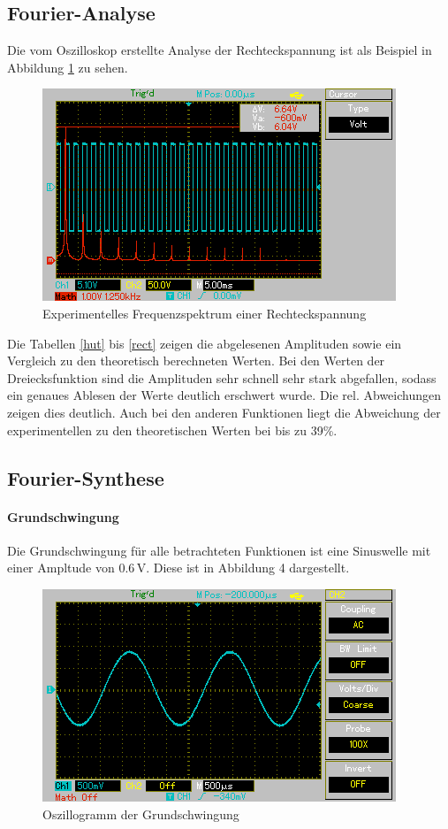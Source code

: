\documentclass[11pt,ngerman,a4paper]{article}
\begin{document}
\subsection{Fourier-Analyse}
Die vom Oszilloskop erstellte Analyse der Rechteckspannung ist als Beispiel in Abbildung \ref{recht} zu sehen.
\begin{figure}[htp]
\centering
\includegraphics[scale=0.8]{Screenshots/MAP001.png}
\caption{Experimentelles Frequenzspektrum einer Rechteckspannung}
\label{recht}
\end{figure}
Die Tabellen \ref{hut} bis \ref{rect} zeigen die abgelesenen Amplituden sowie ein Vergleich zu den theoretisch berechneten Werten. Bei den Werten der Dreiecksfunktion sind die Amplituden sehr schnell sehr stark abgefallen, sodass ein genaues Ablesen der Werte deutlich erschwert wurde. Die rel. Abweichungen zeigen dies deutlich. Auch bei den anderen Funktionen liegt die Abweichung der experimentellen zu den theoretischen Werten bei bis zu 39\%.
\subsection{Fourier-Synthese} 
\paragraph{Grundschwingung} Die Grundschwingung f\"ur alle betrachteten Funktionen ist eine Sinuswelle mit einer Ampltude von $0.6\,$V. Diese ist in Abbildung 4 dargestellt.
\begin{figure}[h]
\centering
\includegraphics[scale=0.8]{Screenshots/basic.png}
\caption{Oszillogramm der Grundschwingung}

\end{figure}
\end{document}
